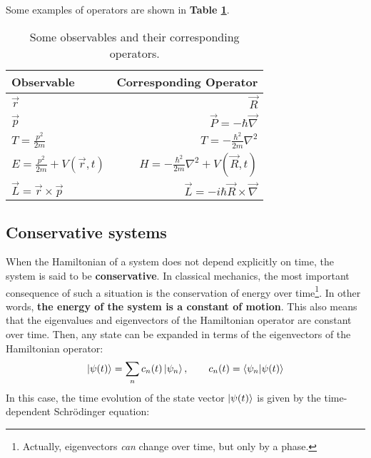 Some examples of operators are shown in \textbf{Table \ref{operators}}.

\begin{table}[htbp] \label{operators}
    \def\arraystretch{1.5}
    \centering
    \begin{tabular}{lr}
        \hline
        \textbf{Observable} & \textbf{Corresponding Operator} \\
        \hline
        $\vec{r}$ & $\vec{R}$ \\
        $\vec{p}$ & $\vec{P} = -\hbar \vec{\nabla}$ \\
        $T = \frac{p^2}{2m}$ & $T = -\frac{\hbar^2}{2m}\nabla^2$ \\
        $E = \frac{p^2}{2m} + V(\vec{r}, t)$ & $H = -\frac{\hbar^2}{2m}\nabla^2 + V(\vec{R}, t)$ \\
        $\vec{L} = \vec{r}\times\vec{p}$ & $\vec{L} = -i\hbar\vec{R}\times\vec{\nabla}$ \\
        \hline
    \end{tabular}
    \caption{Some observables and their corresponding operators.}
\end{table}

\subsection{Conservative systems}

When the Hamiltonian of a system does not depend explicitly on time, the system is said to be \textbf{conservative}. In classical mechanics, the most important consequence of such a situation is the conservation of energy over time\footnote{Actually, eigenvectors \textit{can} change over time, but only by a phase.}. In other words, \textbf{the energy of the system is a constant of motion}. This also means that the eigenvalues and eigenvectors of the Hamiltonian operator are constant over time. Then, any state can be expanded in terms of the eigenvectors of the Hamiltonian operator:
\begin{equation}
    \ket{\psi(t)} = \sum_n c_n(t)\ket{\psi_n},\qquad c_n(t) = \braket{\psi_n|\psi(t)}
\end{equation}
In this case, the time evolution of the state vector $\ket{\psi(t)}$ is given by the time-dependent Schrödinger equation:

